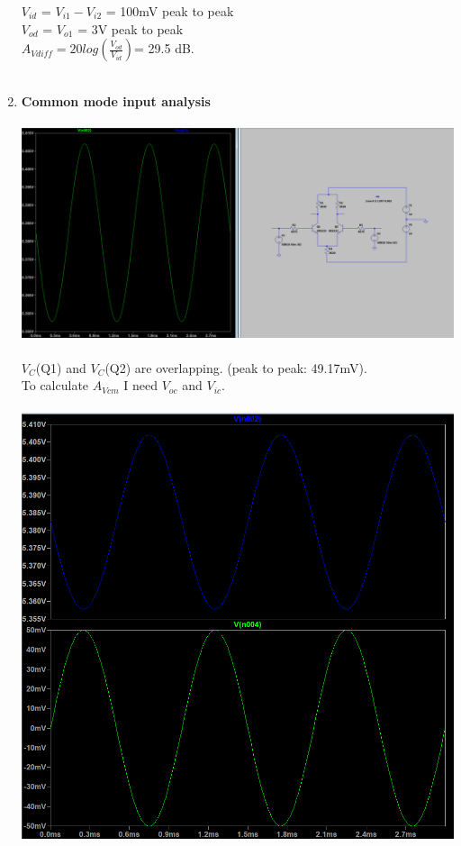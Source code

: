 \documentclass{article}
\begin{document}
\begin{enumerate}
			\(V_{id}\) = \(V_{i1} - V_{i2}\) = 100mV peak to peak\\
			\(V_{od}\) = \(V_{o1}\) = 3V peak to peak\\
			\(A_{Vdiff} = 20log(\frac{V_{od}}{V_{id}}) \)= 29.5 dB.\\\\
			\pagebreak
			\item  \textbf{Common mode input analysis}\\\\
			\includegraphics[scale=0.4]{circuit 3 - coll voltages}\\\\
			\(V_C\)(Q1) and \(V_C\)(Q2) are overlapping. (peak to peak: 49.17mV).\\
			To calculate \(A_{Vcm}\) I need \(V_{oc}\) and \(V_{ic}\).\\\\
			\includegraphics[scale=0.6]{circuit 2 - avcm}\\\\

\end{enumerate}
\end{document}
